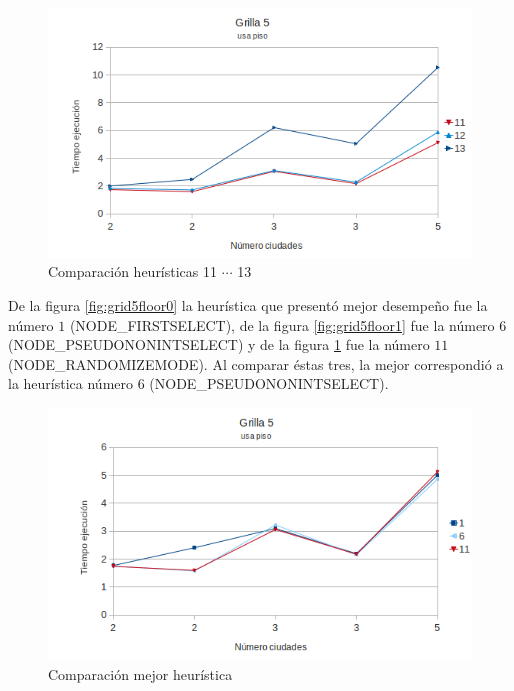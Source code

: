 \documentclass[10pt]{article}
\begin{document}
\begin{figure}[ht]
\begin{minipage}[b]{1\linewidth}
  \centering
 \includegraphics[scale=0.4]{grilla5floor2.png}
 \caption{Comparación heurísticas  11 $\cdots$ 13}
 \label{fig:grid5floor2}
\end{minipage}

\end{figure}


De la figura \ref{fig:grid5floor0} la heurística que presentó mejor desempeño fue la número $1$ (NODE\_FIRSTSELECT), de la figura \ref{fig:grid5floor1} fue la número $6$ (NODE\_PSEUDONONINTSELECT) y de la 
figura \ref{fig:grid5floor2} fue la número $11$ (NODE\_RANDOMIZEMODE). Al comparar éstas tres, la mejor correspondió a la heurística número $6$ (NODE\_PSEUDONONINTSELECT).



\begin{figure}[ht]
\begin{minipage}[b]{1\linewidth}

 \centering
 \includegraphics[scale=0.4]{grilla5floor3.png}
 \caption{Comparación mejor heurística}
 \label{fig:grid5floor3}
\end{minipage}
\end{figure}
\end{document}
